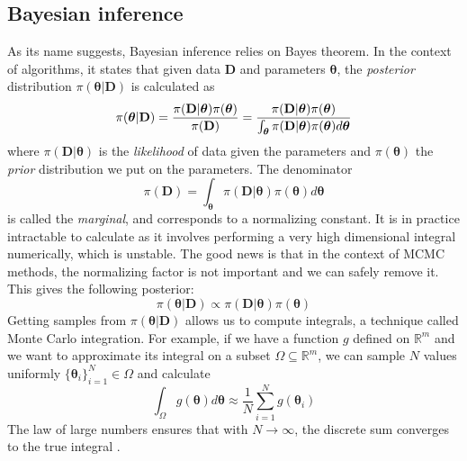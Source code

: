 \documentclass[12pt]{memoir}
\newcommand{\mb}{\mathbf}
\newcommand{\tb}{\textbf}
\newcommand{\ti}{\textit}
\newcommand{\btheta}{\boldsymbol{\theta}}
\begin{document}
\subsection{Bayesian inference}\label{section:background:mcmc:bayesian-inference}
As its name suggests, Bayesian inference relies on Bayes theorem. In the context of algorithms, it states that given data $\mb{D}$ and parameters $\boldsymbol{\theta}$, the \textit{posterior} distribution $\pi(\btheta|\mb{D})$ is calculated as 
\begin{equation} \label{eq:posterior-with-marginal}
    \pi(\boldsymbol{\theta}|\mb{D}) = \frac{\pi(\mb{D}|\boldsymbol{\theta})\pi(\boldsymbol{\theta})}{\pi(\tb D)} = \frac{\pi(\mb{D}|\boldsymbol{\theta})\pi(\boldsymbol{\theta})}{\int_{\boldsymbol{\theta}} \pi(\mb{D}|\boldsymbol{\theta}) \pi(\boldsymbol{\theta})d\boldsymbol{\theta}}
\end{equation}
where $\pi(\mb{D}|\btheta)$ is the \ti{likelihood} of data given the parameters and $\pi(\btheta)$ the \ti{prior} distribution we put on the parameters. The denominator
\begin{equation}
    \pi(\mb{D}) = {\int_{\boldsymbol{\theta}} \pi(\mb{D}|\boldsymbol{\theta}) \pi(\boldsymbol{\theta})d\boldsymbol{\theta}}
\end{equation} 
is called the \ti{marginal}, and corresponds to a normalizing constant. It is in practice intractable to calculate as it involves performing a very high dimensional integral numerically, which is unstable. The good news is that in the context of MCMC methods, the normalizing factor is not important and we can safely remove it. This gives the following posterior:
\begin{equation} \label{eq:posterior-without-marginal}
    \pi(\boldsymbol{\theta}|\mb{D}) \propto {\pi(\mb{D}|\boldsymbol{\theta}) \pi(\boldsymbol{\theta})}
\end{equation}
Getting samples from $\pi(\boldsymbol{\theta}|\mb{D})$ allows us to compute integrals, a technique called Monte Carlo integration. For example, if we have a function $g$ defined on $\mathbb{R}^m$ and we want to approximate its integral on a subset $\Omega \subseteq \mathbb R^m$, we can sample $N$ values uniformly $\{\btheta_i\}_{i=1}^N \in \Omega$ and calculate 
\begin{equation}
    \int_\Omega g(\btheta) d\btheta \approx \frac{1}{N} \sum_{i=1}^{N} g(\btheta_i)
\end{equation}
The law of large numbers ensures that with $N \rightarrow \infty$, the discrete sum converges to the true integral \cite{wiki:monte-carlo-integration}.\medbreak
\end{document}
